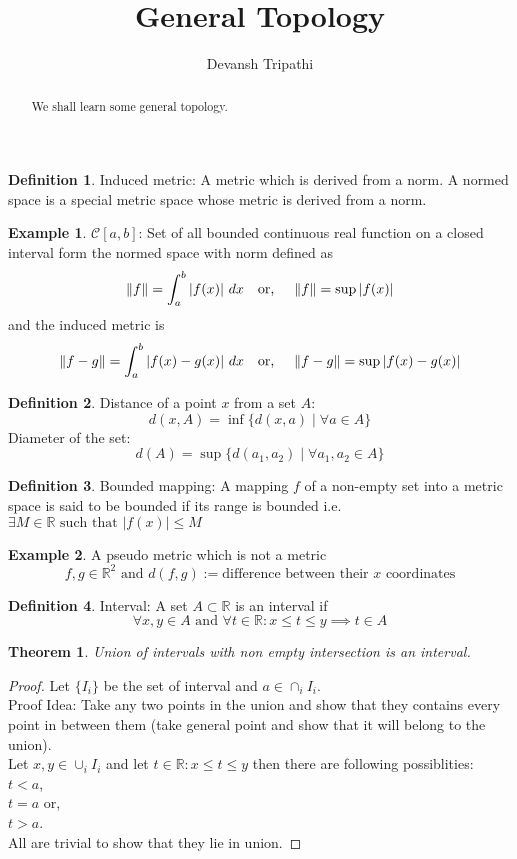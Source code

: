 \documentclass[12pt,reqno]{amsart}
\title{General Topology}
\author{Devansh Tripathi}
\theoremstyle{plain}
\newtheorem{thm}{Theorem}
\theoremstyle{definition}
\newtheorem{defn}{Definition}
\newtheorem{eg}{Example}
\begin{document}
\begin{abstract}
    We shall learn some general topology.
\end{abstract}
\maketitle
\begin{defn}
    Induced metric: A metric which is derived from a norm. A normed space is a special metric space whose metric is derived from a norm.
\end{defn}
\begin{eg}
    $\mathscr{C}[a,b]$: Set of all bounded continuous real function on a closed interval form the normed space with norm defined as $$ \|f\| = \int_a^b |f(x)|~dx \hspace{0.35cm}\text{or,} \hspace{0.5cm} \|f\| = \sup{|f(x)|}$$ and the induced metric is $$ \|f - g \| = \int_a^b |f(x) - g(x)| ~ dx \hspace{0.35cm} \text{or,} \hspace{0.5cm} \|f - g\| = \sup{|f(x) - g(x)|} $$
\end{eg}
\begin{defn}
    Distance of a point $x$ from a set $A$: $$ d(x, A) = \inf\{d(x,a) \mid \forall a \in A \} $$
    Diameter of the set: $$ d(A) = \sup \{d(a_1, a_2) \mid \forall a_1, a_2 \in A\} $$
\end{defn}
\begin{defn}
    Bounded mapping: A mapping $f$ of a non-empty set into a metric space is said to be bounded if its range is bounded i.e. $\exists M \in \mathbb{R} \text{ such that } |f(x)| \leq M $ 
\end{defn}
\begin{eg}
    A pseudo metric which is not a metric
    $$ f,g \in \mathbb{R}^2 \text{ and } d(f,g):= \text{difference between their $x$ coordinates} $$    
\end{eg}
\begin{defn}
    Interval: A set $A \subset \mathbb{R}$ is an interval if $$ \forall x, y \in A \text{ and } \forall t \in \mathbb{R} \colon x \leq t \leq y \implies t \in A $$ 
\end{defn}
\begin{thm}
    Union of intervals with non empty intersection is an interval.    
\end{thm}
\begin{proof}
    Let $\{I_i\}$ be the set of interval and $a \in \cap_i I_i$.\\
    Proof Idea: Take any two points in the union and show that they contains every point in between them (take general point and show that it will belong to the union).\\
    Let $x,y \in \cup_i I_i$ and let $t \in \mathbb{R} \colon x \leq t \leq y $ then there are following possiblities:\\
    $t < a$, \\$ t = a$ or, \\ $t > a$.\\ All are trivial to show that they lie in union.
\end{proof}
\end{document}
